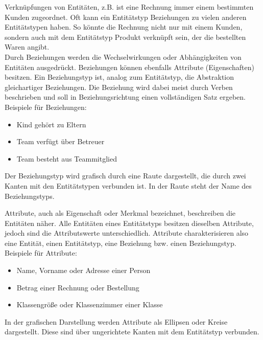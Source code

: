 \begin{tcolorbox}[title=Beziehungen]
	Verknüpfungen von Entitäten, z.B. ist eine Rechnung immer einem bestimmten Kunden zugeordnet. Oft kann ein Entitätstyp Beziehungen zu vielen anderen Entitätstypen haben. So könnte die Rechnung nicht nur mit einem Kunden, sondern auch mit dem Entitätstyp Produkt verknüpft sein, der die bestellten Waren angibt.\\
	Durch Beziehungen werden die Wechselwirkungen oder Abhängigkeiten von Entitäten ausgedrückt. Beziehungen können ebenfalls Attribute (Eigenschaften) besitzen. Ein Beziehungstyp ist, analog zum Entitätstyp, die Abstraktion gleichartiger Beziehungen. Die Beziehung wird dabei meist durch Verben beschrieben und soll in Beziehungsrichtung einen vollständigen Satz ergeben.\\
	Beispiele für Beziehungen:
	\begin{itemize}
		\item Kind gehört zu Eltern
		\item Team verfügt über Betreuer
		\item Team besteht aus Teammitglied
	\end{itemize}
	Der Beziehungstyp wird grafisch durch eine Raute dargestellt, die durch zwei Kanten mit den Entitätstypen verbunden ist. In der Raute steht der Name des Beziehungstyps.
\end{tcolorbox}
\begin{tcolorbox}[title=Attribute]
	Attribute, auch als Eigenschaft oder Merkmal bezeichnet, beschreiben die Entitäten näher. Alle Entitäten eines Entitätstyps besitzen dieselben Attribute, jedoch sind die Attributswerte unterschiedlich. Attribute charakterisieren also eine Entität, einen Entitätstyp, eine Beziehung bzw. einen Beziehungstyp.\\
	Beispiele für Attribute:
	\begin{itemize}
		\item Name, Vorname oder Adresse einer Person
		\item Betrag einer Rechnung oder Bestellung
		\item Klassengröße oder Klassenzimmer einer Klasse
	\end{itemize}
	In der grafischen Darstellung werden Attribute als Ellipsen oder Kreise dargestellt. Diese sind über ungerichtete Kanten mit dem Entitätstyp verbunden.
\end{tcolorbox}
